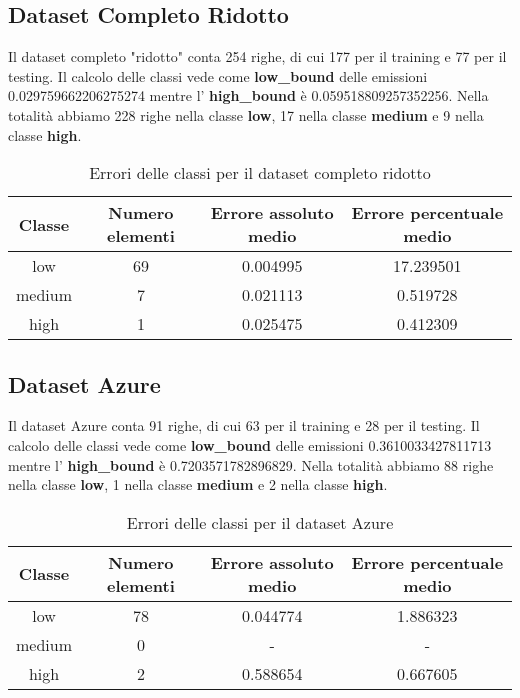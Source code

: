 \subsection{Dataset Completo Ridotto}

Il dataset completo "ridotto" conta 254 righe, di cui 177 per il training e 77 per il testing.
Il calcolo delle classi vede come \textbf{low\_bound} delle emissioni 0.029759662206275274 mentre l' \textbf{high\_bound} è 0.059518809257352256.
Nella totalità abbiamo 228 righe nella classe \textbf{low}, 17 nella classe \textbf{medium} e 9 nella classe \textbf{high}.


\begin{table}[H]
    \centering
    \begin{tabular}{|c|c|c|c|}
        \hline
        \textbf{Classe} &  \textbf{Numero elementi} & \textbf{Errore assoluto medio} & \textbf{Errore percentuale medio} \\ \hline
        low             & 69                & 0.004995                   & 17.239501            \\ \hline
        medium          & 7                & 0.021113                  & 0.519728            \\ \hline
        high            & 1                & 0.025475                   & 0.412309            \\ \hline
    \end{tabular}
    \caption{Errori delle classi per il dataset completo ridotto}
\end{table}


\subsection{Dataset Azure}

Il dataset Azure conta 91 righe, di cui 63 per il training e 28 per il testing.
Il calcolo delle classi vede come \textbf{low\_bound} delle emissioni 0.3610033427811713 mentre l' \textbf{high\_bound} è 0.7203571782896829.
Nella totalità abbiamo 88 righe nella classe \textbf{low}, 1 nella classe \textbf{medium} e 2 nella classe \textbf{high}.


\begin{table}[H]
    \centering
    \begin{tabular}{|c|c|c|c|}
        \hline
        \textbf{Classe} &  \textbf{Numero elementi} & \textbf{Errore assoluto medio} & \textbf{Errore percentuale medio} \\ \hline
        low             & 78                & 0.044774                   & 1.886323            \\ \hline
        medium          & 0                & -                  & -            \\ \hline
        high            & 2                & 0.588654                   & 0.667605            \\ \hline
    \end{tabular}
    \caption{Errori delle classi per il dataset Azure}
\end{table}

